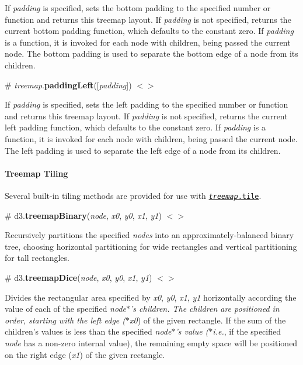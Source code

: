 If {\itshape padding} is specified, sets the bottom padding to the specified number or function and returns this treemap layout. If {\itshape padding} is not specified, returns the current bottom padding function, which defaults to the constant zero. If {\itshape padding} is a function, it is invoked for each node with children, being passed the current node. The bottom padding is used to separate the bottom edge of a node from its children.

\label{_treemap_paddingLeft}%
\# {\itshape treemap}.{\bfseries padding\+Left}(\mbox{[}{\itshape padding}\mbox{]}) \href{https://github.com/d3/d3-hierarchy/blob/master/src/treemap/index.js#L89}{\tt $<$$>$}

If {\itshape padding} is specified, sets the left padding to the specified number or function and returns this treemap layout. If {\itshape padding} is not specified, returns the current left padding function, which defaults to the constant zero. If {\itshape padding} is a function, it is invoked for each node with children, being passed the current node. The left padding is used to separate the left edge of a node from its children.

\paragraph*{Treemap Tiling}

Several built-\/in tiling methods are provided for use with \href{#treemap_tile}{\tt {\itshape treemap}.tile}.

\label{_treemapBinary}%
\# d3.{\bfseries treemap\+Binary}({\itshape node}, {\itshape x0}, {\itshape y0}, {\itshape x1}, {\itshape y1}) \href{https://github.com/d3/d3-hierarchy/blob/master/src/treemap/binary.js}{\tt $<$$>$}

Recursively partitions the specified {\itshape nodes} into an approximately-\/balanced binary tree, choosing horizontal partitioning for wide rectangles and vertical partitioning for tall rectangles.

\label{_treemapDice}%
\# d3.{\bfseries treemap\+Dice}({\itshape node}, {\itshape x0}, {\itshape y0}, {\itshape x1}, {\itshape y1}) \href{https://github.com/d3/d3-hierarchy/blob/master/src/treemap/dice.js}{\tt $<$$>$}

Divides the rectangular area specified by {\itshape x0}, {\itshape y0}, {\itshape x1}, {\itshape y1} horizontally according the value of each of the specified {\itshape node$\ast$’s children. The children are positioned in order, starting with the left edge ($\ast$x0}) of the given rectangle. If the sum of the children’s values is less than the specified {\itshape node$\ast$’s value ($\ast$i.e.}, if the specified {\itshape node} has a non-\/zero internal value), the remaining empty space will be positioned on the right edge ({\itshape x1}) of the given rectangle.

